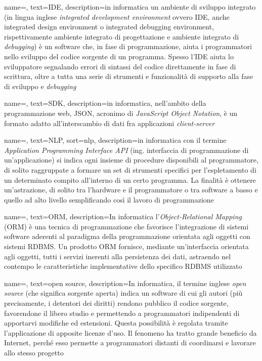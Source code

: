 {
    name=,
    text=IDE,
    description={in informatica un ambiente di sviluppo
integrato (in lingua inglese \emph{integrated development environment} ovvero IDE,
anche integrated design environment o integrated debugging environment, rispettivamente
ambiente integrato di progettazione e ambiente integrato di \emph{debugging})
è un software che, in fase di programmazione, aiuta i programmatori nello sviluppo
del codice sorgente di un programma. Spesso l’IDE aiuta lo sviluppatore
segnalando errori di sintassi del codice direttamente in fase di scrittura, oltre a
tutta una serie di strumenti e funzionalità di supporto alla fase di sviluppo e
\emph{debugging}}
}

{
    name=,
    text=SDK,
    description={in informatica, nell’ambito della programmazione
web, JSON, acronimo di \emph{JavaScript Object Notation}, è un formato adatto
all’interscambio di dati fra applicazioni \emph{client-server}}
}

{
    name=,
    text=NLP,
    sort=nlp,
    description={in informatica con il termine \emph{Application Programming Interface API} (ing. interfaccia di programmazione di un'applicazione) si indica ogni insieme di procedure disponibili al programmatore, di solito raggruppate a formare un set di strumenti specifici per l'espletamento di un determinato compito all'interno di un certo programma. La finalità è ottenere un'astrazione, di solito tra l'hardware e il programmatore o tra software a basso e quello ad alto livello semplificando così il lavoro di programmazione}
}

{
    name=,
    text=ORM,
    description={In informatica l'\emph{Object-Relational Mapping} (ORM) è una tecnica di programmazione che favorisce l'integrazione di sistemi software aderenti al paradigma della programmazione orientata agli oggetti con sistemi RDBMS.
Un prodotto ORM fornisce, mediante un'interfaccia orientata agli oggetti, tutti i servizi inerenti alla persistenza dei dati, astraendo nel contempo le caratteristiche implementative dello specifico RDBMS utilizzato}
}

{
    name=,
    text=open source,
    description={In informatica, il termine inglese \emph{open source} (che significa sorgente aperta) indica un software di cui gli autori (più precisamente, i detentori dei diritti) rendono pubblico il codice sorgente, favorendone il libero studio e permettendo a programmatori indipendenti di apportarvi modifiche ed estensioni. Questa possibilità è regolata tramite l'applicazione di apposite licenze d'uso. Il fenomeno ha tratto grande beneficio da Internet, perché esso permette a programmatori distanti di coordinarsi e lavorare allo stesso progetto}
}

